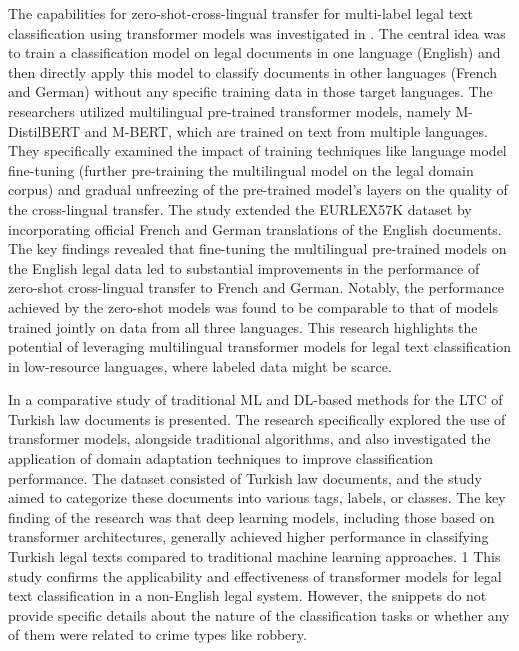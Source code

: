 \documentclass[onecolumn, journal, english, 12pt, a4paper]{IEEEtran} %
\theoremstyle{definition}
\begin{document}
The capabilities for zero-shot-cross-lingual transfer for multi-label
legal text classification using transformer models was investigated in
\cite{Shaheen2021}. The central idea was to train a classification
model on legal documents in one language (English) and then directly
apply this model to classify documents in other languages (French and
German) without any specific training data in those target
languages. The researchers utilized multilingual pre-trained
transformer models, namely M-DistilBERT and M-BERT, which are trained
on text from multiple languages. They specifically examined the impact
of training techniques like language model fine-tuning (further
pre-training the multilingual model on the legal domain corpus) and
gradual unfreezing of the pre-trained model's layers on the quality of
the cross-lingual transfer. The study extended the EURLEX57K dataset
by incorporating official French and German translations of the
English documents. The key findings revealed that fine-tuning the
multilingual pre-trained models on the English legal data led to
substantial improvements in the performance of zero-shot cross-lingual
transfer to French and German. Notably, the performance achieved by
the zero-shot models was found to be comparable to that of models
trained jointly on data from all three languages. This research
highlights the potential of leveraging multilingual transformer models
for legal text classification in low-resource languages, where labeled
data might be scarce.

In \cite{Akca2022} a comparative study of traditional ML and DL-based
methods for the LTC of Turkish law documents is presented. The
research specifically explored the use of transformer models,
alongside traditional algorithms, and also investigated the
application of domain adaptation techniques to improve classification
performance. The dataset consisted of Turkish law documents, and the
study aimed to categorize these documents into various tags, labels,
or classes. The key finding of the research was that deep learning
models, including those based on transformer architectures, generally
achieved higher performance in classifying Turkish legal texts
compared to traditional machine learning approaches. 1 This study
confirms the applicability and effectiveness of transformer models for
legal text classification in a non-English legal system. However, the
snippets do not provide specific details about the nature of the
classification tasks or whether any of them were related to crime
types like robbery.
\end{document}
